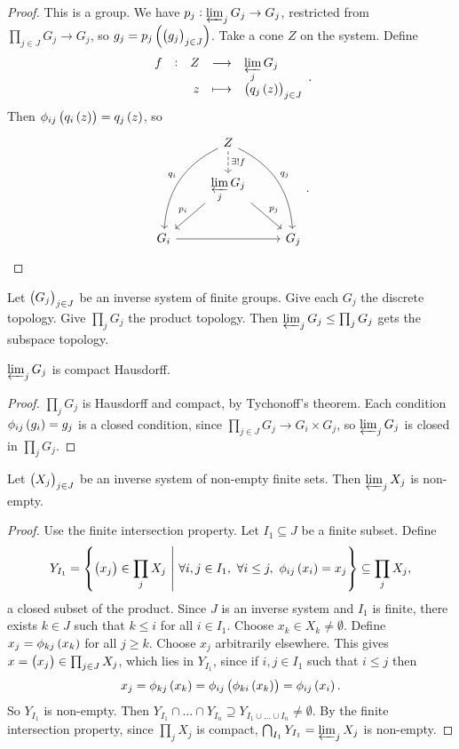 \begin{proof}
This is a group. We have $ p_j : \varprojlim_j G_j \to G_j $, restricted from $ \prod_{j \in J} G_j \to G_j $, so $ g_j = p_j\br{\br{g_j}_{j \in J}} $. Take a cone $ Z $ on the system. Define
$$ \function[f]{Z}{\varprojlim_j G_j}{z}{\br{q_j\br{z}}_{j \in J}}. $$
Then $ \phi_{ij}\br{q_i\br{z}} = q_j\br{z} $, so
$$
\begin{tikzcd}
& Z \arrow[dashed]{d}{\exists !f} \arrow[bend right=30]{ddl}[swap]{q_i} \arrow[bend left=30]{ddr}{q_j} & \\
& \displaystyle\varprojlim_j G_j \arrow{dl}[swap]{p_i} \arrow{dr}{p_j} & \\
G_i \arrow{rr} & & G_j
\end{tikzcd}.
$$
\end{proof}

\pagebreak


\begin{definition*}
Let $ \br{G_j}_{j \in J} $ be an inverse system of finite groups. Give each $ G_j $ the discrete topology. Give $ \prod_j G_j $ the product topology. Then $ \varprojlim_j G_j \le \prod_j G_j $ gets the subspace topology.
\end{definition*}

\begin{proposition}
$ \varprojlim_j G_j $ is compact Hausdorff.
\end{proposition}

\begin{proof}
$ \prod_j G_j $ is Hausdorff and compact, by Tychonoff's theorem. Each condition $ \phi_{ij}\br{g_i} = g_j $ is a closed condition, since $ \prod_{j \in J} G_j \to G_i \times G_j $, so $ \varprojlim_j G_j $ is closed in $ \prod_j G_j $.
\end{proof}

\begin{proposition}
Let $ \br{X_j}_{j \in J} $ be an inverse system of non-empty finite sets. Then $ \varprojlim_j X_j $ is non-empty.
\end{proposition}

\begin{proof}
Use the finite intersection property. Let $ I_1 \subseteq J $ be a finite subset. Define
$$ Y_{I_1} = \cbr{\br{x_j} \in \prod_j X_j \st \forall i, j \in I_1, \ \forall i \le j, \ \phi_{ij}\br{x_i} = x_j} \subseteq \prod_j X_j, $$
a closed subset of the product. Since $ J $ is an inverse system and $ I_1 $ is finite, there exists $ k \in J $ such that $ k \le i $ for all $ i \in I_1 $. Choose $ x_k \in X_k \ne \emptyset $. Define $ x_j = \phi_{kj}\br{x_k} $ for all $ j \ge k $. Choose $ x_j $ arbitrarily elsewhere. This gives $ x = \br{x_j} \in \prod_{j \in J} X_j $, which lies in $ Y_{I_1} $, since if $ i, j \in I_1 $ such that $ i \le j $ then
$$ x_j = \phi_{kj}\br{x_k} = \phi_{ij}\br{\phi_{ki}\br{x_k}} = \phi_{ij}\br{x_i}. $$
So $ Y_{I_1} $ is non-empty. Then $ Y_{I_1} \cap \dots \cap Y_{I_n} \supseteq Y_{I_1 \cup \dots \cup I_n} \ne \emptyset $. By the finite intersection property, since $ \prod_j X_j $ is compact, $ \bigcap_{I_1} Y_{I_1} = \varprojlim_j X_j $ is non-empty.
\end{proof}

